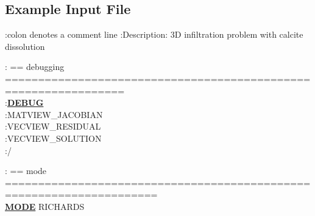 \documentclass[12pt]{article}
\begin{document}

\subsection{Example Input File}

\footnotesize
:colon denotes a comment line
:Description: 3D infiltration problem with calcite dissolution

\noindent
: == debugging ================================================================\\
:\hyperlink{target_dbg}{\bf DEBUG}\\
:MATVIEW\_JACOBIAN\\
:VECVIEW\_RESIDUAL\\
:VECVIEW\_SOLUTION\\
:/

\noindent
: == mode =====================================================================\\
\hyperlink{target_mode}{\bf MODE} RICHARDS
\end{document}
